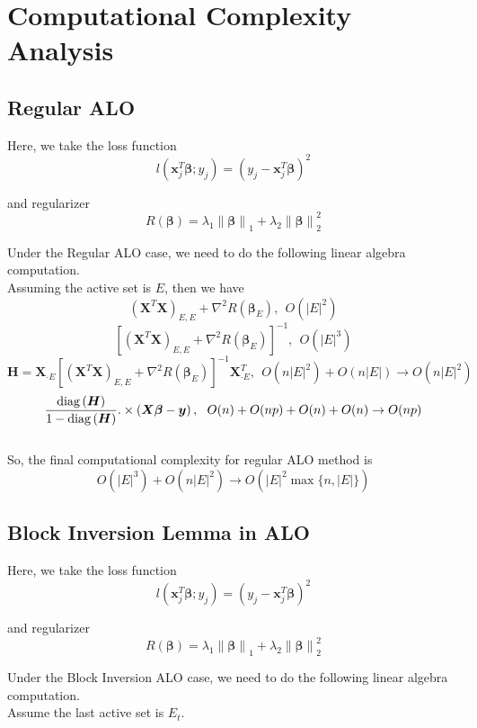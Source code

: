 \documentclass[letter]{article}
\newcommand{\norm}[1]{\left\lVert#1\right\rVert}
\begin{document}
	
	\section{Computational Complexity Analysis}
	
	\subsection{Regular ALO}
	
	Here, we take the loss function 
	$$l\left(\bm{x}_j^T\bm{\beta};y_j\right)=\left(y_j-\bm{x}_j^T\bm{\beta}\right)^2$$
	
	and regularizer
	$$R(\bm{\beta})=\lambda_1\norm{\bm{\beta}}_1+\lambda_2\norm{\bm{\beta}}_2^2$$
	
	Under the Regular ALO case, we need to do the following linear algebra computation.
	\\
	
	Assuming the active set is $E$, then we have
	$$\left(\bm{X}^T\bm{X}\right)_{E,E}+\nabla^2 R\left(\bm{\beta}_E\right),\ \ O(|E|^2)$$
	$$\left[\left(\bm{X}^T\bm{X}\right)_{E,E}+
	\nabla^2 R\left(\bm{\beta}_E\right)\right]^{-1},\ \ O(|E|^3)$$
	$$\bm{H}=\bm{X}_{\cdot E}
	\left[\left(\bm{X}^T\bm{X}\right)_{E,E}+
	\nabla^2 R\left(\bm{\beta}_E\right)\right]^{-1}
	\bm{X}_{\cdot E}^T,\ \ O(n|E|^2)+O(n|E|)\rightarrow O\left(n|E|^2\right)$$
	$$\frac{{\rm diag}\left(\bm{H}\right)}{1-{\rm diag}\left(\bm{H}\right)}.\times\left(\bm{X}\bm{\beta}-\bm{y}\right),\ \ O(n)+O(np)+O(n)+O(n)\rightarrow O(np)$$
	\\
	
	So, the final computational complexity for regular ALO method is 
	$$O(|E|^3)+O\left(n|E|^2\right)\rightarrow O\left(|E|^2\max\{n,|E|\}\right)$$
	
	\subsection{Block Inversion Lemma in ALO}
	
	Here, we take the loss function 
	$$l\left(\bm{x}_j^T\bm{\beta};y_j\right)=\left(y_j-\bm{x}_j^T\bm{\beta}\right)^2$$
	
	and regularizer
	$$R(\bm{\beta})=\lambda_1\norm{\bm{\beta}}_1+\lambda_2\norm{\bm{\beta}}_2^2$$
	
	Under the Block Inversion ALO case, we need to do the following linear algebra computation.
	\\
	
	Assume the last active set is $E_t$. 
	
\end{document}
